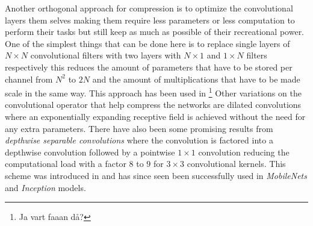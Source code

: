 \documentclass[11pt]{article}
\newcommand{\bibentry}[1]{\cite{#1}}
\begin{document}
Another orthogonal approach for compression is to optimize the convolutional layers them selves making them require less parameters or less computation to perform their tasks but still keep as much as possible of their recreational power. One of the simplest things that can be done here is to replace single layers of \(N \times N\) convolutional filters with two layers with \(N \times 1\) and \(1 \times N\) filters respectively this reduces the amount of parameters that have to be stored per channel from \(N^2\) to \(2N\) and the amount of multiplications that have to be made scale in the same way. This approach has been used in \footnote{Ja vart faaan då?}
Other variations on the convolutional operator that help compress the networks are dilated convolutions\bibentry{yu2015multi} where an exponentially expanding receptive field is achieved without the need for any extra parameters. There have also been some promising results from \emph{depthwise separable convolutions} where the convolution is factored into a depthwise convolution followed by a pointwise \(1 \times 1\) convolution reducing the computational load with a factor \(8\) to \(9\) for \(3 \times 3\) convolutional kernels\bibentry{howard2017mobilenets}. This scheme was introduced in\bibentry{sifre2014rigid} and has since seen been successfully used in \emph{MobileNets}\bibentry{howard2017mobilenets} and \emph{Inception} models\bibentry{ioffe2015batch}. 

 

\end{document}
